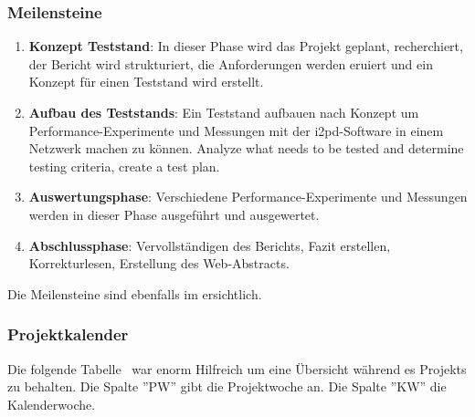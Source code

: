 \subsubsection{Meilensteine}

\begin{enumerate}
    \item \textbf{Konzept Teststand}: 
        In dieser Phase wird das Projekt geplant, recherchiert, der Bericht wird strukturiert, die Anforderungen werden eruiert und  ein Konzept für einen Teststand wird erstellt.
    \item \textbf{Aufbau des Teststands}: Ein Teststand aufbauen nach Konzept um Performance-Experimente und Messungen mit der i2pd-Software in einem Netzwerk machen zu können.
Analyze what needs to be tested and determine testing criteria, create a test plan.
    \item \textbf{Auswertungsphase}: Verschiedene Performance-Experimente und Messungen werden in dieser Phase ausgeführt und ausgewertet.
    \item \textbf{Abschlussphase}: Vervollständigen des Berichts, Fazit erstellen, Korrekturlesen, Erstellung des Web-Abstracts.
\end{enumerate}

Die Meilensteine sind ebenfalls im  ersichtlich.

\subsubsection{Projektkalender}

Die folgende Tabelle~ war enorm Hilfreich um eine Übersicht während es Projekts zu behalten.
Die Spalte ''PW'' gibt die Projektwoche an. Die Spalte ''KW'' die Kalenderwoche.

